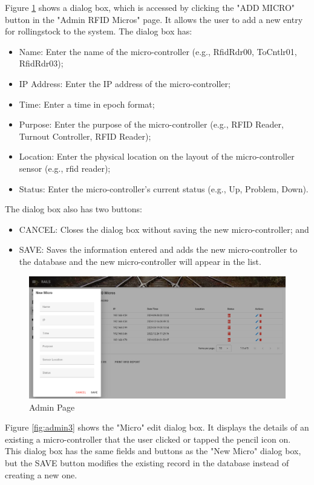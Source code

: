 Figure \ref{fig:admin2} shows a dialog box, which is accessed by clicking the "ADD MICRO" button in the "Admin RFID Micros" page. It allows the user to add 
a new entry for rollingstock to the system. The dialog box has:
\begin{itemize}
    \item Name: Enter the name of the micro-controller (e.g., RfidRdr00, ToCntlr01, RfidRdr03);
    \item IP Address: Enter the IP address of the micro-controller;
    \item Time: Enter a time in \gls{epoch} format;
    \item Purpose: Enter the purpose of the micro-controller (e.g., RFID Reader, Turnout Controller, RFID Reader);
    \item Location: Enter the physical location on the layout of the micro-controller sensor (e.g., \gls{rfid} reader);
    \item Status: Enter the micro-controller's current status (e.g., Up, Problem, Down).
\end{itemize}
The dialog box also has two buttons:
\begin{itemize}
    \item CANCEL: Closes the dialog box without saving the new micro-controller; and
    \item SAVE: Saves the information entered and adds the new micro-controller to the database and the new micro-controller will appear in the list.
\end{itemize}

\begin{figure}[H]
    \centering
    \includegraphics[scale=0.33]{./images/admin-micro-add.png}
    \caption{Admin Page}
    \label{fig:admin2}
\end{figure}

Figure \ref{fig:admin3} shows the "Micro" edit dialog box. It displays the details of an existing a micro-controller that 
the user clicked or tapped the pencil icon on. This dialog box has the same fields and buttons as the "New Micro" dialog box, 
but the SAVE button modifies the existing record in the database instead of creating a new one.

